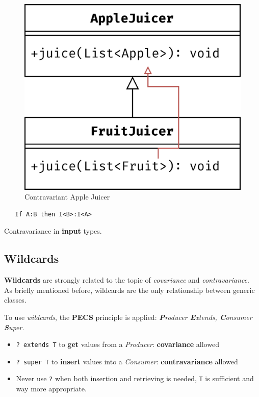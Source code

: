 \begin{paracol}{2}
   \begin{figure}[htbp]
      \centering
      \includegraphics{images/variance2.png}
      \caption{Contravariant Apple Juicer}
      \label{fig:variance2}
   \end{figure}
   \begin{lstlisting}
   If A:B then I<B>:I<A>
   \end{lstlisting}

   Contravariance in \textbf{input} types.

\end{paracol}

\subsection{Wildcards}
\textbf{Wildcards} are strongly related to the topic of \textit{covariance} and \textit{contravariance}.\\
As briefly mentioned before, wildcards are the only relationship between generic classes.

To use \textit{wildcards}, the \textbf{PECS} principle is applied:
\textit{\textbf{P}roducer \textbf{E}xtends, \textbf{C}onsumer \textbf{S}uper}.
\begin{itemize}
   \item \lstinline|? extends T| to \textbf{get} values from a \textit{Producer}: \textbf{covariance} allowed
   \item \lstinline|? super T| to \textbf{insert} values into a \textit{Consumer}: \textbf{contravariance} allowed
   \item Never use \lstinline|?| when both insertion and retrieving is needed, \lstinline|T| is sufficient and way more appropriate.
\end{itemize}



